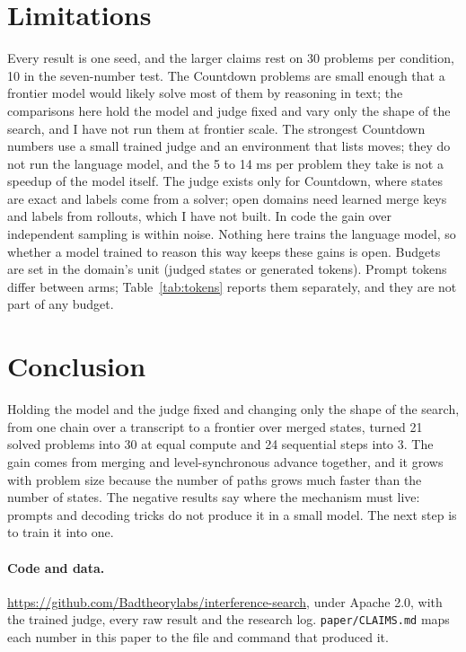 \documentclass[10pt,twocolumn]{article}
\newcommand{\code}[1]{\texttt{#1}}
\begin{document}
\section{Limitations}

Every result is one seed, and the larger claims rest on 30 problems per condition, 10 in the seven-number test. The Countdown problems are small enough that a frontier model would likely solve most of them by reasoning in text; the comparisons here hold the model and judge fixed and vary only the shape of the search, and I have not run them at frontier scale. The strongest Countdown numbers use a small trained judge and an environment that lists moves; they do not run the language model, and the 5 to 14 ms per problem they take is not a speedup of the model itself. The judge exists only for Countdown, where states are exact and labels come from a solver; open domains need learned merge keys and labels from rollouts, which I have not built. In code the gain over independent sampling is within noise. Nothing here trains the language model, so whether a model trained to reason this way keeps these gains is open. Budgets are set in the domain's unit (judged states or generated tokens). Prompt tokens differ between arms; Table~\ref{tab:tokens} reports them separately, and they are not part of any budget.

\section{Conclusion}

Holding the model and the judge fixed and changing only the shape of the search, from one chain over a transcript to a frontier over merged states, turned 21 solved problems into 30 at equal compute and 24 sequential steps into 3. The gain comes from merging and level-synchronous advance together, and it grows with problem size because the number of paths grows much faster than the number of states. The negative results say where the mechanism must live: prompts and decoding tricks do not produce it in a small model. The next step is to train it into one.

\paragraph{Code and data.} \url{https://github.com/Badtheorylabs/interference-search}, under Apache 2.0, with the trained judge, every raw result and the research log. \code{paper/CLAIMS.md} maps each number in this paper to the file and command that produced it.

\balance

{\small }
\end{document}
